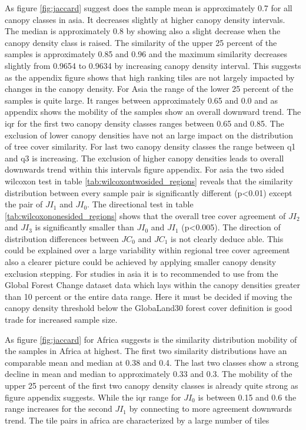			 As figure \ref{fig:jaccard} suggest does the sample mean is approximately 0.7 for all canopy classes in asia. It decreases slightly at higher canopy density intervals. The median is approximately 0.8 by showing also a slight decrease when the canopy density class is raised. The similarity of the upper 25 percent of the samples is approximately 0.85 and 0.96 and the maximum similarity decreases slightly from 0.9654 to 0.9634 by increasing canopy density interval. This suggests as the appendix figure shows that high ranking tiles are not largely impacted by changes in the canopy density. For Asia the range of the lower 25 percent of the samples is quite large. It ranges between approximately 0.65 and 0.0 and as appendix shows the mobility of the samples show an overall downward trend. The iqr for the first two canopy density classes ranges between 0.65 and 0.85. The exclusion of lower canopy densities have not an large impact on the distribution of tree cover similarity. For last two canopy density classes the range between q1 and q3 is increasing. The exclusion of higher canopy densities leads to overall downwards trend within this intervals figure appendix. For asia the two sided wilcoxon test in table \ref{tab:wilcoxontwosided_regions} reveals that the similarity distribution between every sample pair is significantly different (p<0.01) except the pair of $JI_1$ and $JI_0$. The directional test in table \ref{tab:wilcoxononesided_regions} shows that the overall tree cover agreement of $JI_2$ and $JI_3$ is significantly smaller than $JI_0$ and $JI_1$ (p<0.005). The direction of distribution differences between $JC_0$ and $JC_1$ is not clearly deduce able. This could be explained over a large variability within regional tree cover agreement also a clearer picture could be achieved by applying smaller canopy density exclusion stepping. For studies in asia it is to recommended to use from the Global Forest Change dataset data which lays within the canopy densities greater than 10 percent or the entire data range. Here it must be decided if moving the canopy density threshold below the GlobaLand30 forest cover definition is good trade for increased sample size.

			 As figure \ref{fig:jaccard} for Africa suggests is the similarity distribution mobility of the samples in Africa at highest. The first two similarity distributions have an comparable mean and median at 0.38 and 0.4. The last two classes show a strong decline in mean and median to approximately 0.33 and 0.3. The mobility of the upper 25 percent of the first two canopy density classes is already quite strong as figure appendix suggests. While the iqr range for $JI_0$ is between 0.15 and 0.6 the range increases for the second $JI_1$ by connecting to more agreement downwards trend. The tile pairs in africa are characterized by a large number of tiles 

